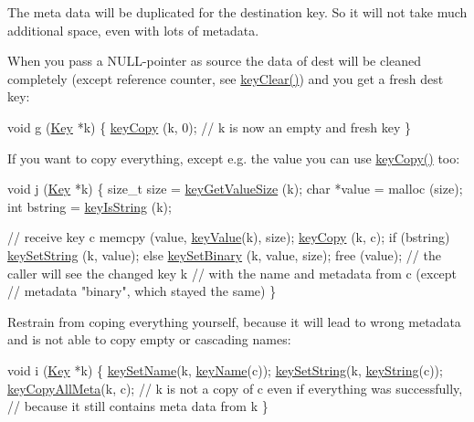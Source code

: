 The meta data will be duplicated for the destination key. So it will not take much additional space, even with lots of metadata.

When you pass a N\-U\-L\-L-\/pointer as source the data of dest will be cleaned completely (except reference counter, see \hyperlink{group__key_gab2242311a36bbc0520e0d36895107ec1}{key\-Clear()}) and you get a fresh dest key\-:


\begin{DoxyCodeInclude}
\textcolor{keywordtype}{void} g (\hyperlink{classkdb_1_1Key_a5679f5cae63caddd64a60388b9cc77fa}{Key} *k)
\{
        \hyperlink{group__key_ga6a12cbbe656a1ad9f41b8c681d7a2f92}{keyCopy} (k, 0);
        \textcolor{comment}{// k is now an empty and fresh key}
\}
\end{DoxyCodeInclude}
 If you want to copy everything, except e.\-g. the value you can use \hyperlink{group__key_ga6a12cbbe656a1ad9f41b8c681d7a2f92}{key\-Copy()} too\-:


\begin{DoxyCodeInclude}
\textcolor{keywordtype}{void} j (\hyperlink{classkdb_1_1Key_a5679f5cae63caddd64a60388b9cc77fa}{Key} *k)
\{
        \textcolor{keywordtype}{size\_t} size = \hyperlink{group__keyvalue_gae326672fffb7474abfe9baf53b73217e}{keyGetValueSize} (k);
        \textcolor{keywordtype}{char} *value = malloc (size);
        \textcolor{keywordtype}{int} bstring = \hyperlink{group__keytest_gaea7670778abd07fee0fe8ac12a149190}{keyIsString} (k);

        \textcolor{comment}{// receive key c}
        memcpy (value, \hyperlink{group__keyvalue_ga6f29609c5da53c6dc26a98678d5752af}{keyValue}(k), size);
        \hyperlink{group__key_ga6a12cbbe656a1ad9f41b8c681d7a2f92}{keyCopy} (k, c);
        \textcolor{keywordflow}{if} (bstring) \hyperlink{group__keyvalue_ga622bde1eb0e0c4994728331326340ef2}{keySetString} (k, value);
        \textcolor{keywordflow}{else} \hyperlink{group__keyvalue_gaa50a5358fd328d373a45f395fa1b99e7}{keySetBinary} (k, value, size);
        free (value);
        \textcolor{comment}{// the caller will see the changed key k}
        \textcolor{comment}{// with the name and metadata from c (except}
        \textcolor{comment}{// metadata "binary", which stayed the same)}
\}
\end{DoxyCodeInclude}
 Restrain from coping everything yourself, because it will lead to wrong metadata and is not able to copy empty or cascading names\-:


\begin{DoxyCodeInclude}
\textcolor{keywordtype}{void} i (\hyperlink{classkdb_1_1Key_a5679f5cae63caddd64a60388b9cc77fa}{Key} *k)
\{
        \hyperlink{group__keyname_ga7699091610e7f3f43d2949514a4b35d9}{keySetName}(k, \hyperlink{group__keyname_ga8e805c726a60da921d3736cda7813513}{keyName}(c));
        \hyperlink{group__keyvalue_ga622bde1eb0e0c4994728331326340ef2}{keySetString}(k, \hyperlink{group__keyvalue_ga880936f2481d28e6e2acbe7486a21d05}{keyString}(c));
        \hyperlink{group__keymeta_ga8e63720a65610a29597494d0671f9401}{keyCopyAllMeta}(k, c);
        \textcolor{comment}{// k is not a copy of c even if everything was successfully,}
        \textcolor{comment}{// because it still contains meta data from k}
\}
\end{DoxyCodeInclude}
 
